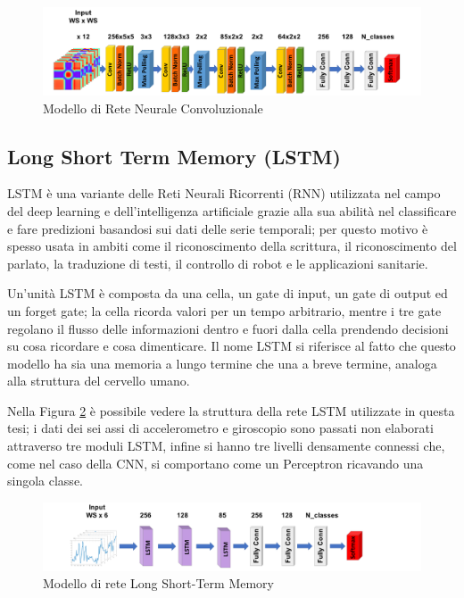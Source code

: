 \begin{figure}[!htb]
    \centering
    \includegraphics[width=\textwidth]{figure/cnn_model.png}
    \caption{Modello di Rete Neurale Convoluzionale}
    \label{fig:cnn-model}
\end{figure}

\subsection{Long Short Term Memory (LSTM)}

LSTM è una variante delle Reti Neurali Ricorrenti (RNN) utilizzata nel campo del deep learning e dell'intelligenza artificiale grazie alla sua abilità nel classificare e fare predizioni basandosi 
sui dati delle serie temporali; per questo motivo è spesso usata in ambiti come il riconoscimento della scrittura, il riconoscimento del parlato, la traduzione di testi, il controllo di robot e 
le applicazioni sanitarie.

Un'unità LSTM è composta da una cella, un gate di input, un gate di output ed un forget gate; la cella ricorda valori per un tempo arbitrario, mentre i tre gate regolano il flusso delle informazioni 
dentro e fuori dalla cella prendendo decisioni su cosa ricordare e cosa dimenticare. Il nome LSTM si riferisce al fatto che questo modello ha sia una memoria a lungo termine che una a breve termine, 
analoga alla struttura del cervello umano.

Nella Figura \ref{fig:lstm-model} è possibile vedere la struttura della rete LSTM utilizzate in questa tesi; i dati dei sei assi di accelerometro e giroscopio sono passati non elaborati attraverso tre moduli 
LSTM, infine si hanno tre livelli densamente connessi che, come nel caso della CNN, si comportano come un Perceptron ricavando una singola classe.

\begin{figure}[!htb]
    \centering
    \includegraphics[width=\textwidth]{figure/lstm_model.png}
    \caption{Modello di rete Long Short-Term Memory}
    \label{fig:lstm-model}
\end{figure}


